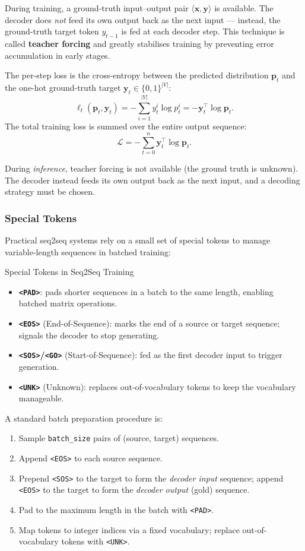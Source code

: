 \documentclass[11pt,a4paper]{article}
\newcommand{\term}[1]{\textcolor{DefGreen}{\textbf{#1}}}
\begin{document}
During training, a ground-truth input--output pair $\langle \mathbf{x}, \mathbf{y} \rangle$ is available. The decoder does \emph{not} feed its own output back as the next input — instead, the ground-truth target token $y_{t-1}$ is fed at each decoder step. This technique is called \term{teacher forcing} and greatly stabilises training by preventing error accumulation in early stages.

The per-step loss is the cross-entropy between the predicted distribution $\mathbf{p}_t$ and the one-hot ground-truth target $\mathbf{y}_t \in \{0,1\}^{|V|}$:
\[
  \ell_t(\mathbf{p}_t, \mathbf{y}_t) = -\sum_{i=1}^{|V|} y_t^i \log p_t^i = -\mathbf{y}_t^\top \log \mathbf{p}_t.
\]
The total training loss is summed over the entire output sequence:
\[
  \mathcal{L} = -\sum_{t=0}^{n} \mathbf{y}_t^\top \log \mathbf{p}_t.
\]

During \emph{inference}, teacher forcing is not available (the ground truth is unknown). The decoder instead feeds its own output back as the next input, and a decoding strategy must be chosen.

\subsubsection{Special Tokens}

Practical seq2seq systems rely on a small set of special tokens to manage variable-length sequences in batched training:

\begin{defbox}{Special Tokens in Seq2Seq Training}
\begin{itemize}
  \item \textbf{\texttt{<PAD>}}: pads shorter sequences in a batch to the same length, enabling batched matrix operations.
  \item \textbf{\texttt{<EOS>}} (End-of-Sequence): marks the end of a source or target sequence; signals the decoder to stop generating.
  \item \textbf{\texttt{<SOS>}/\texttt{<GO>}} (Start-of-Sequence): fed as the first decoder input to trigger generation.
  \item \textbf{\texttt{<UNK>}} (Unknown): replaces out-of-vocabulary tokens to keep the vocabulary manageable.
\end{itemize}
\end{defbox}

A standard batch preparation procedure is:
\begin{enumerate}
  \item Sample \texttt{batch\_size} pairs of (source, target) sequences.
  \item Append \texttt{<EOS>} to each source sequence.
  \item Prepend \texttt{<SOS>} to the target to form the \emph{decoder input} sequence; append \texttt{<EOS>} to the target to form the \emph{decoder output} (gold) sequence.
  \item Pad to the maximum length in the batch with \texttt{<PAD>}.
  \item Map tokens to integer indices via a fixed vocabulary; replace out-of-vocabulary tokens with \texttt{<UNK>}.
\end{enumerate}
\end{document}
